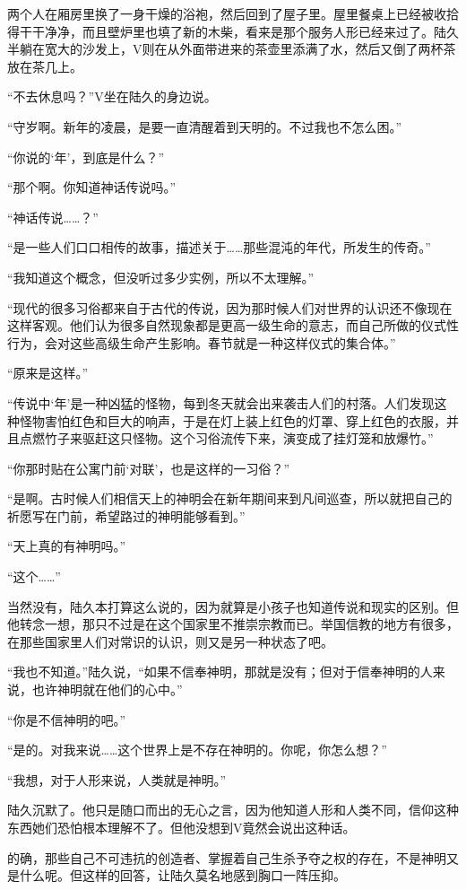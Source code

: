两个人在厢房里换了一身干燥的浴袍，然后回到了屋子里。屋里餐桌上已经被收拾得干干净净，而且壁炉里也填了新的木柴，看来是那个服务人形已经来过了。陆久半躺在宽大的沙发上，V则在从外面带进来的茶壶里添满了水，然后又倒了两杯茶放在茶几上。

“不去休息吗？”V坐在陆久的身边说。

“守岁啊。新年的凌晨，是要一直清醒着到天明的。不过我也不怎么困。”

“你说的‘年’，到底是什么？”

“那个啊。你知道神话传说吗。” 

“神话传说……？”

“是一些人们口口相传的故事，描述关于……那些混沌的年代，所发生的传奇。”

“我知道这个概念，但没听过多少实例，所以不太理解。” 

“现代的很多习俗都来自于古代的传说，因为那时候人们对世界的认识还不像现在这样客观。他们认为很多自然现象都是更高一级生命的意志，而自己所做的仪式性行为，会对这些高级生命产生影响。春节就是一种这样仪式的集合体。”

“原来是这样。”

“传说中‘年’是一种凶猛的怪物，每到冬天就会出来袭击人们的村落。人们发现这种怪物害怕红色和巨大的响声，于是在灯上装上红色的灯罩、穿上红色的衣服，并且点燃竹子来驱赶这只怪物。这个习俗流传下来，演变成了挂灯笼和放爆竹。”

“你那时贴在公寓门前‘对联’，也是这样的一习俗？”

“是啊。古时候人们相信天上的神明会在新年期间来到凡间巡查，所以就把自己的祈愿写在门前，希望路过的神明能够看到。”

“天上真的有神明吗。”

“这个……”

当然没有，陆久本打算这么说的，因为就算是小孩子也知道传说和现实的区别。但他转念一想，那只不过是在这个国家里不推崇宗教而已。举国信教的地方有很多，在那些国家里人们对常识的认识，则又是另一种状态了吧。

“我也不知道。”陆久说，“如果不信奉神明，那就是没有；但对于信奉神明的人来说，也许神明就在他们的心中。”

“你是不信神明的吧。”

“是的。对我来说……这个世界上是不存在神明的。你呢，你怎么想？”

“我想，对于人形来说，人类就是神明。”

陆久沉默了。他只是随口而出的无心之言，因为他知道人形和人类不同，信仰这种东西她们恐怕根本理解不了。但他没想到V竟然会说出这种话。

的确，那些自己不可违抗的创造者、掌握着自己生杀予夺之权的存在，不是神明又是什么呢。但这样的回答，让陆久莫名地感到胸口一阵压抑。

